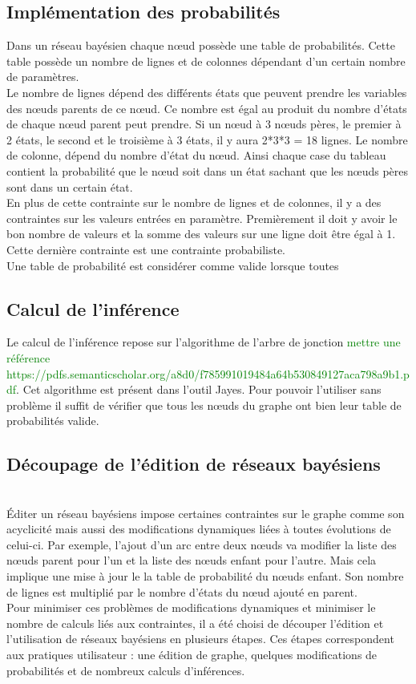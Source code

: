\documentclass[conference]{IEEEtran}
\begin{document}
\subsection{Implémentation des probabilités}
Dans un réseau bayésien chaque nœud possède une table de probabilités. Cette table possède un nombre de lignes et de colonnes dépendant d'un certain nombre de paramètres. \\
Le nombre de lignes dépend des différents états que peuvent prendre les variables des nœuds parents de ce nœud. Ce nombre est égal au produit du nombre d'états de chaque nœud parent peut prendre. Si un nœud à 3 nœuds pères, le premier à 2 états, le second et le troisième à 3 états, il y aura 2*3*3 = 18 lignes. Le nombre de colonne, dépend du nombre d'état du nœud. Ainsi chaque case du tableau contient la probabilité que le nœud soit dans un état sachant que les nœuds pères sont dans un certain état.\\
En plus de cette contrainte sur le nombre de lignes et de colonnes, il y a des contraintes sur les valeurs entrées en paramètre. Premièrement il doit y avoir le bon nombre de valeurs et la somme des valeurs sur une ligne doit être égal à 1. Cette dernière contrainte est une contrainte probabiliste. \\  
Une table de probabilité est considérer comme valide lorsque toutes  

\subsection{Calcul de l'inférence}
Le calcul de l'inférence repose sur l'algorithme de l'arbre de jonction \textcolor{green}{mettre une référence https://pdfs.semanticscholar.org/a8d0/f785991019484a64b530849127aca798a9b1.pdf}. Cet algorithme est présent dans l'outil Jayes. Pour pouvoir l'utiliser sans problème il suffit de vérifier que tous les nœuds du graphe ont bien leur table de probabilités valide. 

\subsection{Découpage de l'édition de réseaux bayésiens \hfill}
\\
Éditer un réseau bayésiens impose certaines contraintes sur le graphe comme son acyclicité mais aussi des modifications dynamiques liées à toutes évolutions de celui-ci. Par exemple, l'ajout d'un arc entre deux nœuds va modifier la liste des nœuds parent pour l'un et la liste des nœuds enfant pour l'autre. Mais cela implique une mise à jour le la table de probabilité du nœuds enfant. Son nombre de lignes est multiplié par le nombre d'états du nœud ajouté en parent. \\
Pour minimiser ces problèmes de modifications dynamiques et minimiser le nombre de calculs liés aux contraintes, il a été choisi de découper l'édition et l'utilisation de réseaux bayésiens en plusieurs étapes. Ces étapes correspondent aux pratiques utilisateur  : une édition de graphe, quelques modifications de probabilités et de nombreux calculs d'inférences. \\
\end{document}
